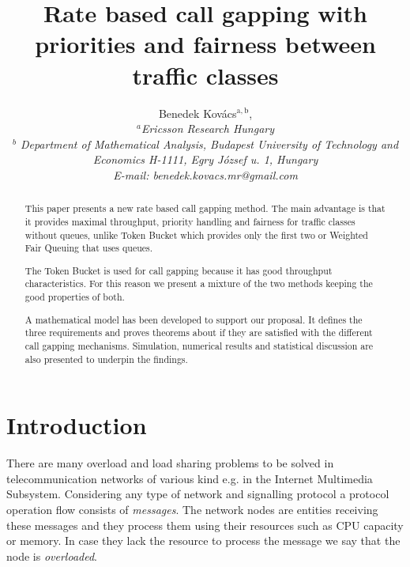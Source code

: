 \documentclass[conference]{IEEEtran}
\newcommand{\comment}[1]{}
\begin{document}
\title{Rate based call gapping with priorities and fairness between traffic classes}

\author{Benedek Kov\'acs$^{\mathrm{a},\mathrm{b}}$,\\
\small\itshape $^a$Ericsson Research Hungary\\ $^b$ Department of
Mathematical Analysis, Budapest University of Technology and
Economics H-1111, Egry J\'ozsef u. 1, Hungary\\
E-mail: benedek.kovacs.mr@gmail.com}

\comment{
\author{Benedek Kov\'acs\\
Ericsson Research Hungary and\\Budapest University of Technology and Economics\\
Email: benedek.kovacs.mr@gmail.com\\
NOT FINAL VERSION}}

\maketitle

\begin{abstract}
This paper presents a new rate based call gapping method. The main
advantage is that it provides maximal throughput, priority handling
and fairness for traffic classes without queues, unlike Token Bucket
which provides only the first two or Weighted Fair Queuing that uses
queues.

The Token Bucket is used for call gapping because it has good
throughput characteristics. For this reason we present a mixture of
the two methods keeping the good properties of both.

A mathematical model has been developed to support our proposal. It
defines the three requirements and proves theorems about if they are
satisfied with the different call gapping mechanisms. Simulation,
numerical results and statistical discussion are also presented to
underpin the findings.
\end{abstract}


\section{Introduction}
There are many overload and load sharing problems to be solved in
telecommunication networks of various kind e.g. in the Internet
Multimedia Subsystem. Considering any type of network and signalling
protocol a protocol operation flow consists of \textit{messages}.
The network nodes are entities receiving these messages and they
process them using their resources such as CPU capacity or memory.
In case they lack the resource to process the message we say that
the node is \textit{overloaded}.
\end{document}

